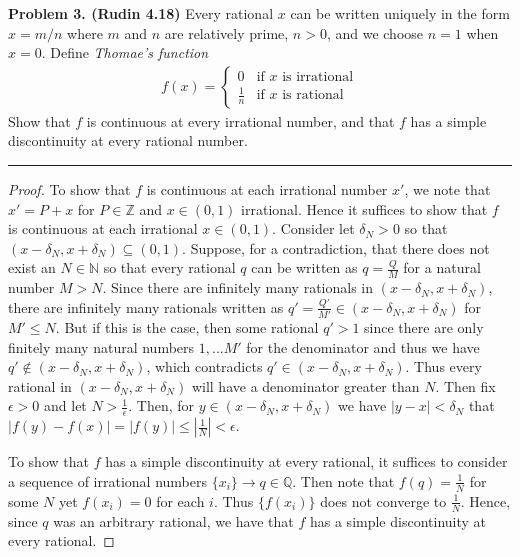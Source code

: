 \documentclass[leqno]{article}
\theoremstyle{nonumberplain}
\newtheorem{proof}{Proof}
\begin{document}
\noindent\textbf{Problem 3. (Rudin 4.18)} Every rational $x$ can be written uniquely in the form $x=m/n$ where $m$ and $n$ are relatively prime, $n>0$, and we choose $n=1$ when $x=0$. Define \emph{Thomae's function}
\begin{align*}
f(x)=
\begin{cases}
0 & \textrm{if } x \textrm{ is irrational}\\
\frac{1}{n} & \textrm{if } x \textrm{ is rational}
\end{cases}
\end{align*}
Show that $f$ is continuous at every irrational number, and that $f$ has a simple discontinuity at every rational number.

\noindent\rule[0.5ex]{\linewidth}{1pt}

\begin{proof}
To show that $f$ is continuous at each irrational number $x'$, we note that $x'=P+x$ for $P\in \mathbb{Z}$ and $x \in (0,1)$ irrational. Hence it suffices to show that $f$ is continuous at each irrational $x\in (0,1)$.  Consider let $\delta_N >0$ so that $(x-\delta_N,x+\delta_N)\subseteq (0,1)$.  Suppose, for a contradiction, that there does not exist an $N\in \mathbb{N}$ so that every rational $q$ can be written as $q=\frac{Q}{M}$ for a natural number $M>N$.  Since there are infinitely many rationals in $(x-\delta_N,x+\delta_N)$, there are infinitely many rationals written as $q'=\frac{Q'}{M'}\in (x-\delta_N,x+\delta_N)$ for $M'\leq N$.  But if this is the case, then some rational $q'>1$ since there are only finitely many natural numbers $1,...M'$ for the denominator and thus we have $q'\notin (x-\delta_N,x+\delta_N)$, which contradicts $q'\in (x-\delta_N,x+\delta_N)$.  Thus every rational in $(x-\delta_N,x+\delta_N)$ will have a denominator greater than $N$.  Then fix $\epsilon>0$ and let $N>\frac{1}{\epsilon}$.  Then, for $y\in (x-\delta_N,x+\delta_N)$ we have $|y-x|<\delta_N$ that $|f(y)-f(x)|=|f(y)|\leq |\frac{1}{N}|<\epsilon$.

To show that $f$ has a simple discontinuity at every rational, it suffices to consider a sequence of irrational numbers $\{x_i\}\to q\in \mathbb{Q}$.  Then note that $f(q)=\frac{1}{N}$ for some $N$ yet $f(x_i)=0$ for each $i$.  Thus $\{f(x_i)\}$ does not converge to $\frac{1}{N}$.  Hence, since $q$ was an arbitrary rational, we have that $f$ has a simple discontinuity at every rational.
\end{proof}

\pagebreak
\end{document}
